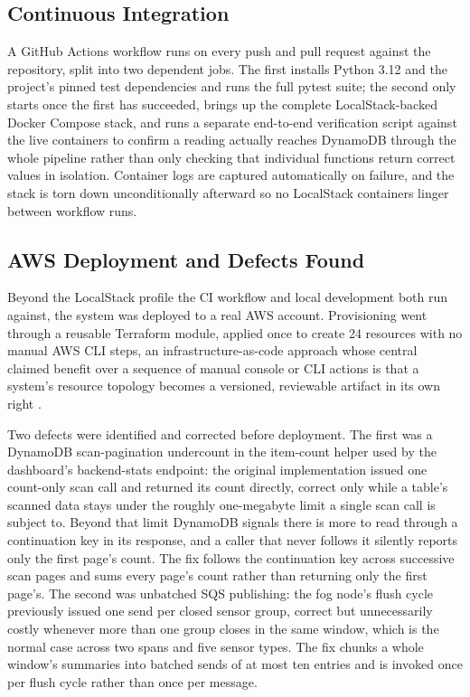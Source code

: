 \documentclass[conference]{IEEEtran}
\begin{document}
\subsection{Continuous Integration}

A GitHub Actions workflow runs on every push and pull request against the repository, split into two dependent jobs. The first installs Python 3.12 and the project's pinned test dependencies and runs the full pytest suite; the second only starts once the first has succeeded, brings up the complete LocalStack-backed Docker Compose stack, and runs a separate end-to-end verification script against the live containers to confirm a reading actually reaches DynamoDB through the whole pipeline rather than only checking that individual functions return correct values in isolation. Container logs are captured automatically on failure, and the stack is torn down unconditionally afterward so no LocalStack containers linger between workflow runs.

\subsection{AWS Deployment and Defects Found}

Beyond the LocalStack profile the CI workflow and local development both run against, the system was deployed to a real AWS account. Provisioning went through a reusable Terraform module, applied once to create 24 resources with no manual AWS CLI steps, an infrastructure-as-code approach whose central claimed benefit over a sequence of manual console or CLI actions is that a system's resource topology becomes a versioned, reviewable artifact in its own right \cite{ref10}.

Two defects were identified and corrected before deployment. The first was a DynamoDB scan-pagination undercount in the item-count helper used by the dashboard's backend-stats endpoint: the original implementation issued one count-only scan call and returned its count directly, correct only while a table's scanned data stays under the roughly one-megabyte limit a single scan call is subject to. Beyond that limit DynamoDB signals there is more to read through a continuation key in its response, and a caller that never follows it silently reports only the first page's count. The fix follows the continuation key across successive scan pages and sums every page's count rather than returning only the first page's. The second was unbatched SQS publishing: the fog node's flush cycle previously issued one send per closed sensor group, correct but unnecessarily costly whenever more than one group closes in the same window, which is the normal case across two spans and five sensor types. The fix chunks a whole window's summaries into batched sends of at most ten entries and is invoked once per flush cycle rather than once per message.
\end{document}
